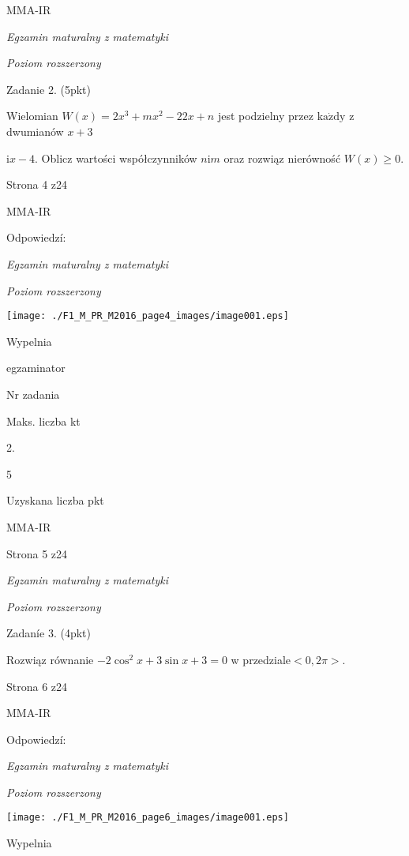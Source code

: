 \documentclass[a4paper,12pt]{article}
\begin{document}
MMA-IR





{\it Egzamin maturalny z matematyki}

{\it Poziom rozszerzony}

Zadanie 2. (5pkt)

Wielomian $W(x)=2x^{3}+mx^{2}-22x+n$ jest podzielny przez $\mathrm{k}\mathrm{a}\dot{\mathrm{z}}\mathrm{d}\mathrm{y}$ z dwumianów $x+3$

$\mathrm{i}x-4$. Oblicz wartości współczynników $n\mathrm{i}m$ oraz rozwiąz nierówność $W(x)\geq 0.$

Strona 4 z24

MMA-IR





Odpowiedzí:

{\it Egzamin maturalny z matematyki}

{\it Poziom rozszerzony}
\begin{center}
\texttt{[image: ./F1\_M\_PR\_M2016\_page4\_images/image001.eps]}
\end{center}
Wypelnia

egzaminator

Nr zadania

Maks. liczba kt

2.

5

Uzyskana liczba pkt

MMA-IR

Strona 5 z24





{\it Egzamin maturalny z matematyki}

{\it Poziom rozszerzony}

Zadaníe 3. (4pkt)

Rozwiąz równanie $-2\cos^{2}x+3\sin x+3=0$ w przedziale$<0,2\pi>.$

Strona 6 z24

MMA-IR





Odpowiedzí:

{\it Egzamin maturalny z matematyki}

{\it Poziom rozszerzony}
\begin{center}
\texttt{[image: ./F1\_M\_PR\_M2016\_page6\_images/image001.eps]}
\end{center}
Wypelnia
\end{document}
